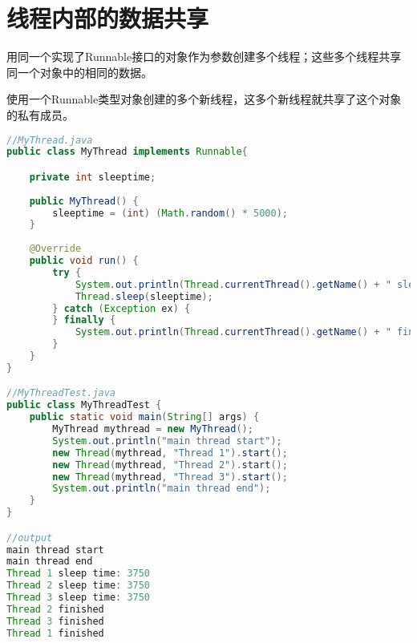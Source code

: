 \section{线程内部的数据共享}
用同一个实现了Runnable接口的对象作为参数创建多个线程；这些多个线程共享同一个对象中的相同的数据。
\par 使用一个Runnable类型对象创建的多个新线程，这多个新线程就共享了这个对象的私有成员。
\begin{lstlisting}[language=java]
//MyThread.java
public class MyThread implements Runnable{

	private int sleeptime;
	
	public MyThread() {
		sleeptime = (int) (Math.random() * 5000);
	}
	
	@Override
	public void run() {
		try {
			System.out.println(Thread.currentThread().getName() + " sleep time: " + sleeptime);
			Thread.sleep(sleeptime);
		} catch (Exception ex) {
		} finally {
			System.out.println(Thread.currentThread().getName() + " finished");
		}
	}
}

//MyThreadTest.java
public class MyThreadTest {
	public static void main(String[] args) {
		MyThread mythread = new MyThread();
		System.out.println("main thread start");
		new Thread(mythread, "Thread 1").start();
		new Thread(mythread, "Thread 2").start();
		new Thread(mythread, "Thread 3").start();
		System.out.println("main thread end");
	}
}

//output
main thread start
main thread end
Thread 1 sleep time: 3750
Thread 2 sleep time: 3750
Thread 3 sleep time: 3750
Thread 2 finished
Thread 3 finished
Thread 1 finished
\end{lstlisting}